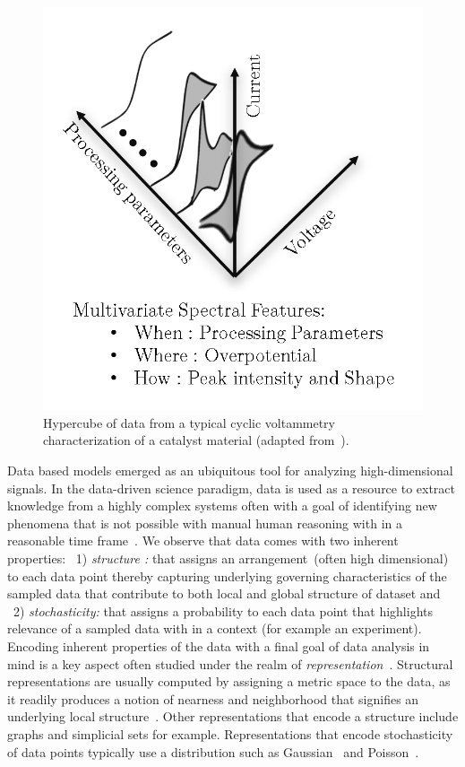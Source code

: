 \begin{figure}[h!]
    \centering
    \includegraphics[width=0.45\columnwidth]{Chapter-1/figures/spectral_hypercube.png}
    \caption{Hypercube of data from a typical cyclic voltammetry characterization of a catalyst material (adapted from~\cite{rajan2013informatics}).}
    \label{fig:spectrahypercube}
\end{figure}


Data based models emerged as an ubiquitous tool for analyzing high-dimensional signals.
In the data-driven science paradigm, data is used as a resource to extract knowledge from a highly complex systems often with a goal of identifying new phenomena that is not possible with manual human reasoning with in a reasonable time frame~\cite{brunton2019data}.
We observe that data comes with two inherent properties: ~1) \textit{structure :} that assigns an arrangement~(often high dimensional) to each data point thereby capturing underlying governing characteristics of the sampled data that contribute to both local and global structure of dataset and ~2) \textit{stochasticity:} that assigns a probability to each data point that highlights relevance of a sampled data with in a context (for example an experiment). 
Encoding inherent properties of the data with a final goal of data analysis in mind is a key aspect often studied under the realm of \textit{representation}~\cite{bengio2013representation}. 
Structural representations are usually computed by assigning a metric space to the data, as it readily produces a notion of nearness and neighborhood that signifies an underlying local structure~\cite{mcinnes2018umap}. 
Other representations that encode a structure include graphs and simplicial sets for example. 
Representations that encode stochasticity of data points typically use a distribution such as Gaussian~\cite{gardner2015bayesian,gavaghan2018use} and Poisson~\cite{flory1940molecular}.


